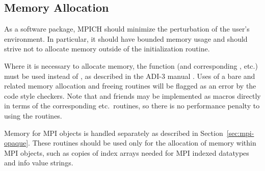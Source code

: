 \documentclass{article}
\begin{document}


\subsection{Memory Allocation}
As a software package, MPICH should minimize the perturbation of the user's
environment.  In 
particular, it should have bounded memory usage and should strive not to
allocate memory outside of the initialization routine.  

Where it is necessary to allocate memory, the function 
(and corresponding , etc.) must be used instead of
, as described in the ADI-3 manual \cite{adi3man}.  Uses of a
bare  and related memory allocation and freeing routines will be
flagged as an error by the code style checkers.  Note that 
and friends may be implemented as macros directly in terms of the
corresponding  etc.~routines, so there is no performance penalty
to using the  routines.

Memory for MPI objects is handled separately as described in
Section~\ref{sec:mpi-opaque}.  These routines should be used only for
the allocation of memory within MPI objects, such as copies of index
arrays needed for MPI indexed datatypes and info value strings.
\end{document}
